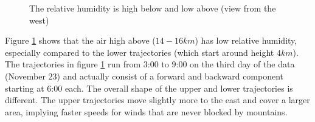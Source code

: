 \begin{figure}
\centering
{}
\caption{The relative humidity is high below and low above (view from the west)}
\label{fig:highanddry}
\end{figure}
Figure \ref{fig:highanddry} shows that the air high above ($14 - 16 km$) has low relative humidity, especially compared to the lower trajectories (which start around height $4 km$). The trajectories in figure \ref{fig:highanddry} run from $3$:$00$ to $9$:$00$ on the third day of the data (November $23$) and actually consist of a forward and backward component starting at $6$:$00$ each.
The overall shape of the upper and lower trajectories is different. The upper trajectories move slightly more to the east and cover a larger area, implying faster speeds for winds that are never blocked by mountains. 




